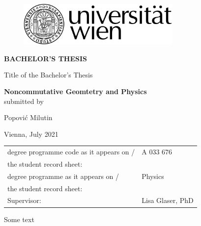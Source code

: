 \documentclass[12pt]{report}
\begin{document}
\begin{titlepage}

\begin{center}
\begin{figure}
\hspace{9.1cm}
\includegraphics[width=8cm]{./uni_logo}
\end{figure}
\vspace*{2.1cm}

\fontsize{22}{0} \selectfont \textbf{BACHELOR'S THESIS}\\
\vspace*{2.5cm}

\fontsize{12}{0} \selectfont Title of the Bachelor's Thesis\\
\vspace*{0.4cm}

\fontsize{18}{0} \selectfont \textbf{Noncommutative Geomtetry and Physics}\\

\vspace*{2.8cm}
    {\fontsize{12}{0} \selectfont submitted by}\\
\vspace*{0.4cm}

    { \fontsize{14}{0} \selectfont Popović Milutin}\\

\vspace*{2.5cm}

    { \fontsize{12}{0} \selectfont Vienna, July 2021}\\

\vspace*{4.5cm}

\begin{tabular}{p{9cm}p{11.25cm}}
        \fontsize{12}{0} \selectfont degree programme code as it appears on / &
        \fontsize{12}{0} \selectfont A 033 676 \\

        \fontsize{12}{0} \selectfont the student record sheet:\vspace*{0.4cm} &
        \fontsize{12}{0} \selectfont\\

        \fontsize{12}{0} \selectfont degree
        programme as it appears on / &  \fontsize{12}{0} \selectfont Physics \\

        \fontsize{12}{0} \selectfont the student record sheet:\vspace*{0.4cm} &
        \fontsize{12}{0} \selectfont \\

        \fontsize{12}{0} \selectfont
        Supervisor:\vspace*{0.4cm}& \fontsize{12}{0} \selectfont Lisa Glaser, PhD\\
\end{tabular}
\end{center}
\end{titlepage}

\newpage
 Some text

\nocite{electrodynamics}
\nocite{ncgwalter}
\nocite{liealgebra}
\nocite{ncg4pages}
\nocite{ncgshort}
\nocite{heatkernel}
\printbibliography
\end{document}
